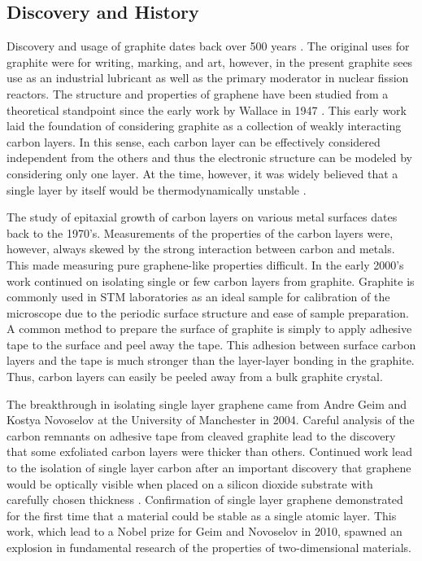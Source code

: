   \subsection{Discovery and History}
Discovery and usage of graphite dates back over 500 years \cite{honeycombcarbon}. The original uses for graphite were for writing, marking, and art, however, in the present graphite sees use as an industrial lubricant as well as the primary moderator in nuclear fission reactors. The structure and properties of graphene have been studied from a theoretical standpoint since the early work by Wallace in 1947 \cite{wallace}. This early work laid the foundation of considering graphite as a collection of weakly interacting carbon layers. In this sense, each carbon layer can be effectively considered independent from the others and thus the electronic structure can be modeled by considering only one layer. At the time, however, it was widely believed that a single layer by itself would be thermodynamically unstable \cite{Geim}.

	The study of epitaxial growth of carbon layers on various metal surfaces dates back to the 1970's. Measurements of the properties of the carbon layers were, however, always skewed by the strong interaction between carbon and metals. This made measuring pure graphene-like properties difficult. In the early 2000's work continued on isolating single or few carbon layers from graphite. Graphite is commonly used in STM laboratories as an ideal sample for calibration of the microscope due to the periodic surface structure and ease of sample preparation. A common method to prepare the surface of graphite is simply to apply adhesive tape to the surface and peel away the tape. This adhesion between surface carbon layers and the tape is much stronger than the layer-layer bonding in the graphite. Thus, carbon layers can easily be peeled away from a bulk graphite crystal.

	The breakthrough in isolating single layer graphene came from Andre Geim and Kostya Novoselov at the University of Manchester in 2004. Careful analysis of the carbon remnants on adhesive tape from cleaved graphite lead to the discovery that some exfoliated carbon layers were thicker than others. Continued work lead to the isolation of single layer carbon after an important discovery that graphene would be optically visible when placed on a silicon dioxide substrate with carefully chosen thickness \cite{Geim}. Confirmation of single layer graphene demonstrated for the first time that a material could be stable as a single atomic layer. This work, which lead to a Nobel prize for Geim and Novoselov in 2010, spawned an explosion in fundamental research of the properties of two-dimensional materials.


